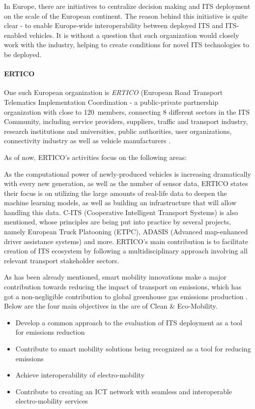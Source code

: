 \documentclass[main.tex]{subfiles}
\begin{document}
In Europe, there are initiatives to centralize decision making and ITS deployment on the scale of 
the European continent. The reason behind this initiative is quite clear - to enable Europe-wide 
interoperability between deployed ITS and ITS-enabled vehicles. It is without a question that 
such organization would closely work with the industry, helping to create conditions for novel 
ITS technologies to be deployed.

\paragraph{ERTICO}

One such European organization is \emph{ERTICO} (European Road Transport Telematics
Implementation Coordination - a public-private partnership organization
with close to 120~members, connecting 8 different sectors in the ITS Community, including
service providers, suppliers, traffic and transport industry, research institutions and
universities, public authorities, user organizations, connectivity industry as well as
vehicle manufacturers \cite{ertico}.

As of now, ERTICO's activities focus on the following areas:

As the computational power of newly-produced vehicles is increasing dramatically with every 
new generation, as well as the number of sensor data, ERTICO states their focus is on utilizing 
the large amounts of real-life data to deepen the machine learning models, as well as building 
an infrastructure that will allow handling this data. C-ITS (Cooperative Intelligent Transport
Systems) is also mentioned, whose principles are being put into practice by several projects, 
namely European Truck Platooning (ETPC), ADASIS (Advanced map-enhanced driver assistance systems) and 
more. ERTICO's main contribution is to facilitate creation of ITS ecosystem by following a
multidisciplinary approach involving all relevant transport stakeholder sectors.

As has been already mentioned, smart mobility innovations make a major contribution towards 
reducing the impact of transport on emissions, which has got a non-negligible contribution to 
global greenhouse gas emissions production \cite{Ritchie2020}. Below are the four main
objectives in the are of Clean \& Eco-Mobility. 

\begin{itemize}
    \setlength\itemsep{-10pt}
    \item Develop a common approach to the evaluation of ITS deployment as a tool for emissions reduction
    \item Contribute to smart mobility solutions being recognized as a tool for reducing emissions
    \item Achieve interoperability of electro-mobility
    \item Contribute to creating an ICT network with seamless and interoperable electro-mobility services
\end{itemize}
\end{document}
